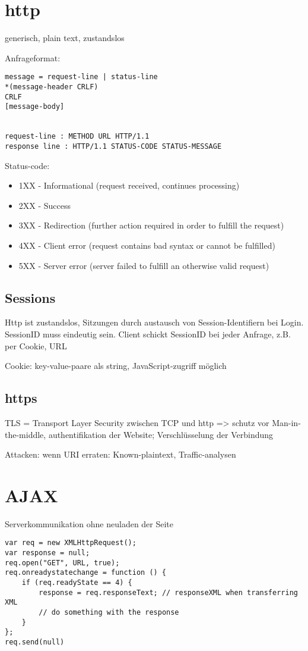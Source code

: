 \section*{http}
generisch, plain text, zustandslos

Anfrageformat:
\begin{verbatim}
message = request-line | status-line
*(message-header CRLF)
CRLF
[message-body]


request-line : METHOD URL HTTP/1.1
response line : HTTP/1.1 STATUS-CODE STATUS-MESSAGE
\end{verbatim}

Status-code:
\begin{itemize}
\item 1XX - Informational (request received, continues processing)
\item 2XX - Success
\item 3XX - Redirection (further action required in order to fulfill the request)
\item 4XX - Client error (request contains bad syntax or cannot be fulfilled)
\item 5XX - Server error (server failed to fulfill an otherwise valid request)
\end{itemize}

\subsection*{Sessions}
Http ist zustandslos, Sitzungen durch austausch von Session-Identifiern bei Login. SessionID muss eindeutig sein. Client schickt SessionID bei jeder Anfrage, z.B. per Cookie, URL

Cookie: key-value-paare als string, JavaScript-zugriff möglich

\subsection*{https}
TLS = Transport Layer Security zwischen TCP und http => schutz vor Man-in-the-middle, authentifikation der Website; Verschlüsselung der Verbindung

Attacken: wenn URI erraten: Known-plaintext,  Traffic-analysen
\section*{AJAX}
Serverkommunikation ohne neuladen der Seite
\begin{verbatim}
var req = new XMLHttpRequest();
var response = null;
req.open("GET", URL, true);
req.onreadystatechange = function () {
	if (req.readyState == 4) {
		response = req.responseText; // responseXML when transferring XML
		// do something with the response
	}
};
req.send(null)
\end{verbatim}

